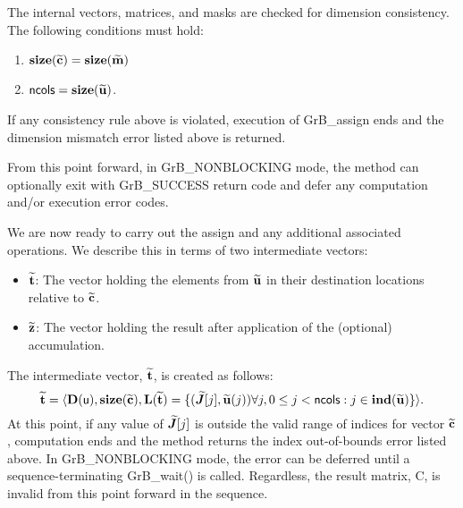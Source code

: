 The internal vectors, matrices, and masks are checked for dimension consistency. 
The following conditions must hold:
\begin{enumerate}
	\item $\bold{size}({\bf \widetilde{c}}) = \bold{size}({\bf \widetilde{m}})$
    \item ${\sf ncols} = \bold{size}({\bf \widetilde{u}})$.
\end{enumerate}
If any consistency rule above is violated, execution of {\sf GrB\_assign} ends and 
the dimension mismatch error listed above is returned.

From this point forward, in {\sf GrB\_NONBLOCKING} mode, the method can 
optionally exit with {\sf GrB\_SUCCESS} return code and defer any computation 
and/or execution error codes.

We are now ready to carry out the assign and any additional 
associated operations.  We describe this in terms of two intermediate vectors:
\begin{itemize}
    \item ${\bf \widetilde{t}}$: The vector holding the elements from
    ${\bf \widetilde{u}}$ in their destination locations relative to 
    ${\bf \widetilde{c}}$.
    
    \item ${\bf \widetilde{z}}$: The vector holding the result after 
    application of the (optional) accumulation.
\end{itemize}

The intermediate vector, ${\bf \widetilde{t}}$, is created as follows:
\[
{\bf \widetilde{t}} = \langle
\bold{D}({\sf u}), \bold{size}({\bf \widetilde{c}}),
\bold{L}({\bf \widetilde{t}}) =
\{(\bm{\widetilde{J}}[j],{\bf \widetilde{u}}(j)) \forall j, 0 \leq j < {\sf ncols} : 
j \in \bold{ind}({\bf \widetilde{u}}) \} \rangle. 
\]
At this point, if any value of $\bm{\widetilde{J}}[j]$ is outside the valid 
range of indices for vector ${\bf \widetilde{c}}$, computation ends and the 
method returns the index out-of-bounds error listed above. In 
{\sf GrB\_NONBLOCKING} mode, the error can be deferred until a 
sequence-terminating {\sf GrB\_wait()} is called.  Regardless, the result 
matrix, {\sf C}, is invalid from this point forward in the 
sequence.

